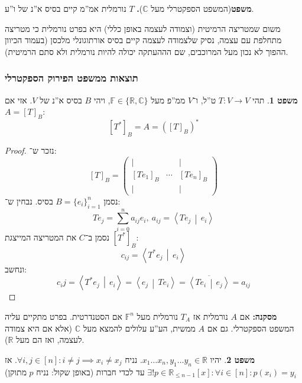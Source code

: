 \documentclass[a4paper]{article}
\newcommand\R     {\mathbb{R}}
\newcommand\C     {\mathbb{C}}
\newcommand\ra    {\rangle}
\newcommand\la    {\langle}
\newcommand\ol    {\overline}
\newcommand\sumni     {\sum_{i = 0}^{n}}
\newcommand\F         {\mathbb{F}}
\newcommand\co        {\colon}
\newcommand\pms[1]    {\begin{pmatrix}
		#1
\end{pmatrix}}
\newcommand\mut [2]   {\left \la #1 \,\middle|\, #2 \right \ra}
\theoremstyle{definition}
\newtheorem{Theorem}{\color{myblue}משפט}
\newcommand\theo  [1] {\begin{Theorem}#1\end{Theorem}}
\begin{document}
	\textbf{משפט}{(המשפט הספקטרלי מעל $\C$)\textbf{. } $T$ נורמלית אמ''מ קיים בסיס א''נ של ו''ע. }
	
	משום שמטריצה הרמיטית (וצמודה לעצמה באופן כללי) היא בפרט נורמלית כי מטריצה מתחלפת עם עצמה, נסיק שלצמודה לעצמה קיים בסיס אורתוגונלי מלכסן (בעמוד הכיוון ההפוך לא נכון מעל המרוכבים, שם הההעתקה יכולה להיות נורמלית ולא סתם הרמיטית). 
	
	\subsubsection{תוצאות ממשפט הפירוק הספקטרלי}
	
	\theo{תהי $T \co V \to V$ ט''ל, ו־$V$ ממ''פ מעל $\F \in \{\R, \C\}$, ויהי $B$ בסיס א''נ של $V$. אזי אם $A = [T]_B$: 
		\[ [T^*]_B = A = ([T]_B)^* \]}  
	\begin{proof}
		נזכר ש־: 
		\[ [T]_B = \pms{\vert &  & \vert \\ [Te_1]_B & \cdots & [Te_n]_B \\ \vert &  & \vert} \]
		נסמן $B = \{e_i\}_{i = 1}^{n}$ בסיס. נבחין ש־: 
		\[ Te_j = \sumni a_{ij}e_i, \ a_{ij} = \mut{Te_j}{e_i} \]
		נסמן ב־$C$ את המטריצה המייצגת $[T^*]_B$: 
		\[ c_{ij} = \mut{T^*e_j}{e_i} \]
		ונחשב: 
		\[ c_ij = \mut{T^*e_j}{e_i} = \mut{e_j}{Te_i} = \ol{\mut{Te_i}{e_j}} = a_{ij} \]
		
	\end{proof}
	
	\textbf{מסקנה: }אם $A$ נורמלית אז $T_A$ נורמלית מעל $\F^n$ אם הסטנדרטית. בפרט מתקיים עליה המשפט הספקטרלי. גם אם $A$ ממשית, הע''ע עלולים להמצא מעל $\C$ (אלא אם היא צמודה לעצמה, ואז הם מעל $\R$). 
	
	\theo{יהיו $x_1 \dots x_n, y_1 \dots y_n \in \R$. נניח $\forall i, j \in [n] \co i \neq j \implies x_i \neq x_j$. אז $\exists! p \in \R_{\le n - 1}[x] \co \forall i \in [n] \co p(x_i) = y_i$ עד לכדי חברות (באופן שקול: נניח $p$ מתוקן) }
	
\end{document}
